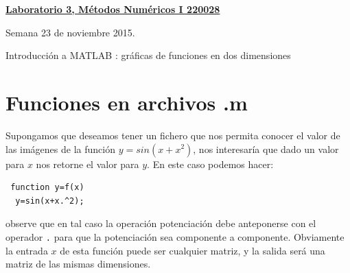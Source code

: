 \documentclass[11pt]{article}
\begin{document}
\hspace*{-1,5cm}

\vspace*{0.5cm} \centerline {\bf\underline{Laboratorio 3, M\'etodos Num\'ericos I 220028 }}
\centerline{\textrm{Semana 23 de noviembre 2015.}}  \vspace{0.2cm}





\centerline{Introducci\'on  a MATLAB \circledR: gr\'aficas de funciones en dos dimensiones} 
%

\section{Funciones en archivos .m}
Supongamos que deseamos tener un fichero que nos permita conocer el valor de las im\'agenes de la funci\'on 
$y=sin(x+x^2)$, nos interesar\'ia que dado un valor para $x$ nos retorne el valor para $y$. En este caso podemos hacer:
\begin{verbatim}
 function y=f(x)
  y=sin(x+x.^2);
\end{verbatim}
observe que en tal caso la operaci\'on potenciaci\'on debe anteponerse con el operador \texttt{.} para que la 
potenciaci\'on sea componente a componente. Obviamente la entrada $x$ de esta funci\'on puede ser cualquier matriz, y 
la salida ser\'a una matriz de las mismas dimensiones.
\end{document}
